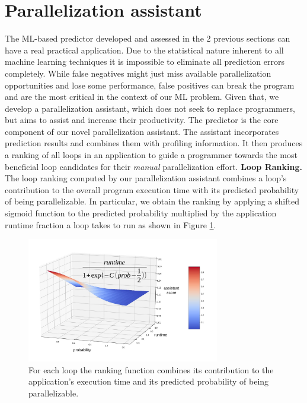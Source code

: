 \section{Parallelization assistant}
\label{practical_applications}
\quad The ML-based predictor developed and assessed in the 2 previous sections can have a real practical application. Due to the statistical nature inherent to all machine learning techniques it is impossible to eliminate all prediction errors completely. While false negatives might just miss available parallelization opportunities and lose some performance, false positives can break the program and are the most critical in the context of our ML problem. Given that, we develop a parallelization assistant, which does not seek to replace programmers, but aims to assist and increase their productivity. The predictor is the core component of our novel parallelization assistant. The assistant incorporates prediction results and combines them with profiling information. It then produces a ranking of all loops in an application to guide a programmer towards the most beneficial loop candidates for their \textit{manual} parallelization effort.\newline\null 
\quad \textbf{Loop Ranking.} The loop ranking computed by our parallelization assistant combines a loop's contribution to the overall program execution time with its predicted probability of being parallelizable. In particular, we obtain the ranking by applying a shifted sigmoid function to the predicted probability multiplied by the application runtime fraction a loop takes to run as shown in Figure \ref{fig:sigmoid_3d}.
\begin{figure}[ht]
\includegraphics[width=0.75\textwidth]{images/product_func.pdf}
\centering
\caption{For each loop the ranking function combines its contribution to the application's execution time and its predicted probability of being parallelizable.}
\label{fig:sigmoid_3d}
\end{figure}
